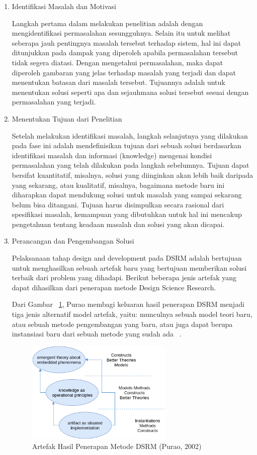 \begin{enumerate}
\item Identifikasi Masalah dan Motivasi


Langkah pertama dalam melakukan penelitian adalah dengan mengidentifikasi permasalahan sesungguhnya. Selain itu untuk melihat seberapa jauh pentingnya masalah tersebut terhadap sistem, hal ini dapat ditunjukkan pada dampak yang diperoleh apabila permasalahan tersebut tidak segera diatasi. Dengan mengetahui permasalahan, maka dapat diperoleh gambaran yang jelas terhadap masalah yang terjadi dan dapat menentukan batasan dari masalah tersebut. Tujuannya adalah untuk menentukan solusi seperti apa dan sejauhmana solusi tersebut sesuai dengan permasalahan yang terjadi.


\item Menentukan Tujuan dari Penelitian


Setelah melakukan identifikasi masalah, langkah selanjutnya yang dilakukan pada fase ini adalah mendefinisikan tujuan dari sebuah solusi berdasarkan identifikasi masalah dan informasi (knowledge) mengenai kondisi permasalahan yang telah dilakukan pada langkah sebelumnya. Tujuan dapat bersifat kuantitatif, misalnya, solusi yang diinginkan akan lebih baik daripada yang sekarang, atau kualitatif, misalnya, bagaimana metode baru ini diharapkan dapat mendukung solusi untuk masalah yang sampai sekarang belum bisa ditangani. Tujuan harus disimpulkan secara rasional dari spesifikasi masalah, kemampuan yang dibutuhkan untuk hal ini mencakup pengetahuan tentang keadaan masalah dan solusi yang akan dicapai.


\item Perancangan dan Pengembangan Solusi


Pelaksanaan tahap design and development pada DSRM adalah bertujuan untuk menghasilkan sebuah artefak baru yang bertujuan memberikan solusi terbaik dari problem yang dihadapi. Berikut beberapa jenis artefak yang dapat dihasilkan dari penerapan metode Design Science Research.


Dari Gambar ~\ref{fig:dsrm-artifact}, Purao membagi keluaran hasil penerapan DSRM menjadi tiga jenis alternatif model artefak, yaitu: munculnya sebuah model teori baru, atau sebuah metode pengembangan yang baru, atau juga dapat berupa instansiasi baru dari sebuah metode yang sudah ada ~\cite{purao_design_2002}.

\begin{figure}[h]
    \centering
    \includegraphics[width=7cm]{../../Resources/Images/dsrm-artifact}
    \caption{Artefak Hasil Penerapan Metode DSRM (Purao, 2002)}
    \label{fig:dsrm-artifact}
\end{figure}



\end{enumerate}
